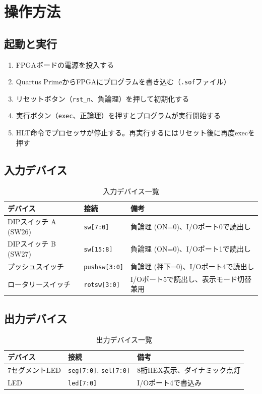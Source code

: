 \documentclass[a4paper,11pt]{ltjsarticle}
\begin{document}
\section{操作方法}

\subsection{起動と実行}

\begin{enumerate}
\item FPGAボードの電源を投入する
\item Quartus PrimeからFPGAにプログラムを書き込む（\texttt{.sof}ファイル）
\item リセットボタン（\texttt{rst\_n}、負論理）を押して初期化する
\item 実行ボタン（\texttt{exec}、正論理）を押すとプログラムが実行開始する
\item HLT命令でプロセッサが停止する。再実行するにはリセット後に再度execを押す
\end{enumerate}

\subsection{入力デバイス}

\begin{table}[h]
\centering
\caption{入力デバイス一覧}
\begin{tabular}{lll}
\toprule
デバイス & 接続 & 備考 \\
\midrule
DIPスイッチ A (SW26) & \texttt{sw[7:0]} & 負論理 (ON=0)、I/Oポート0で読出し \\
DIPスイッチ B (SW27) & \texttt{sw[15:8]} & 負論理 (ON=0)、I/Oポート1で読出し \\
プッシュスイッチ     & \texttt{pushsw[3:0]} & 負論理 (押下=0)、I/Oポート4で読出し \\
ロータリースイッチ   & \texttt{rotsw[3:0]} & I/Oポート5で読出し、表示モード切替兼用 \\
\bottomrule
\end{tabular}
\end{table}

\subsection{出力デバイス}

\begin{table}[h]
\centering
\caption{出力デバイス一覧}
\begin{tabular}{lll}
\toprule
デバイス & 接続 & 備考 \\
\midrule
7セグメントLED & \texttt{seg[7:0]}, \texttt{sel[7:0]} & 8桁HEX表示、ダイナミック点灯 \\
LED            & \texttt{led[7:0]} & I/Oポート4で書込み \\
\bottomrule
\end{tabular}
\end{table}
\end{document}
